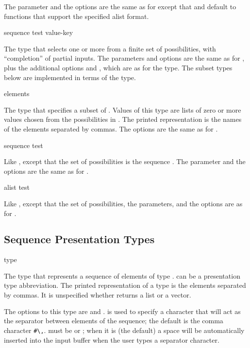 The  parameter and the options are the same as for 
except that  and  default to functions
that support the specified alist format.


 {sequence \key test value-key}

The type that selects one or more from a finite set of possibilities, with
``completion'' of partial inputs.  The parameters and options are the same as
for , plus the additional options  and
, which are as for the  type.  The subset types
below are implemented in terms of the  type.


 {\rest elements}

The type that specifies a subset of .  Values of this type are
lists of zero or more values chosen from the possibilities in .
The printed representation is the names of the elements separated by commas.
The options are the same as for .


 {sequence \key test}

Like , except that the set of possibilities is the sequence
.  The parameter  and the options are the same as for
.


 {alist \key test}

Like , except that the set of possibilities, the parameters, and the
options are as for .


\subsection {Sequence Presentation Types}

 {type}

The type that represents a sequence of elements of type .  
can be a presentation type abbreviation.  The printed representation of a
 type is the elements separated by commas.  It is unspecified
whether  returns a list or a vector.

The options to this type are  and .
 is used to specify a character that will act as the separator
between elements of the sequence; the default is the comma character \verb+#\,+.
 must be  or ; when it is 
(the default) a space will be automatically inserted into the input buffer when
the user types a separator character.


